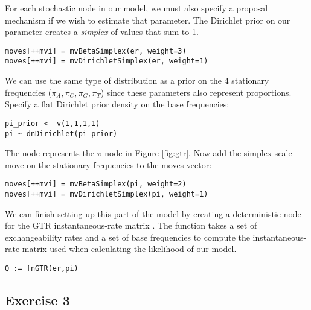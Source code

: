 For each stochastic node in our model, we must also specify a proposal mechanism if we wish to estimate that parameter. 
The Dirichlet prior on our parameter  creates a \href{http://en.wikipedia.org/wiki/Simplex}{\textit{simplex}} of values that sum to 1. 

{\tt\small \begin{snugshade*}
\begin{lstlisting}
moves[++mvi] = mvBetaSimplex(er, weight=3)
moves[++mvi] = mvDirichletSimplex(er, weight=1)
\end{lstlisting}
\end{snugshade*}}

We can use the same type of distribution as a prior on the 4 stationary frequencies ($\pi_A, \pi_C, \pi_G, \pi_T$) since these parameters also represent proportions. 
Specify a flat Dirichlet prior density on the base frequencies:
{\tt \begin{snugshade*}
\begin{lstlisting}
pi_prior <- v(1,1,1,1) 
pi ~ dnDirichlet(pi_prior)
\end{lstlisting}
\end{snugshade*}}

The node  represents the $\pi$ node in Figure \ref{fig:gtr}.
Now add the simplex scale move on the stationary frequencies to the moves vector:
{\tt \small \begin{snugshade*}
\begin{lstlisting}
moves[++mvi] = mvBetaSimplex(pi, weight=2)
moves[++mvi] = mvDirichletSimplex(pi, weight=1)
\end{lstlisting}
\end{snugshade*}}

We can finish setting up this part of the model by creating a deterministic node for the GTR instantaneous-rate matrix . 
The  function takes a set of exchangeability rates and a set of base frequencies to compute the instantaneous-rate matrix used when calculating the likelihood of our model.
{\tt \begin{snugshade*}
\begin{lstlisting}
Q := fnGTR(er,pi)
\end{lstlisting}
\end{snugshade*}}




\subsection{Exercise 3}

